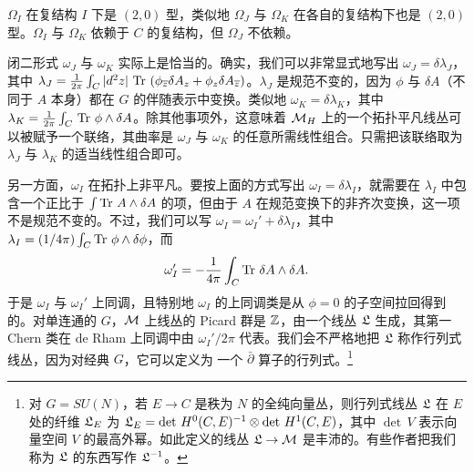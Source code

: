 $\Omega_I$ 在复结构 $I$ 下是 $(2,0)$ 型，类似地 $\Omega_J$ 与 $\Omega_K$ 在各自的复结构下也是 $(2,0)$ 型。$\Omega_I$ 与 $\Omega_K$ 依赖于 $C$ 的复结构，但 $\Omega_J$ 不依赖。

闭二形式 $\omega_J$ 与 $\omega_K$ 实际上是恰当的。确实，我们可以非常显式地写出 $\omega_J=\delta\lambda_J$，其中 $\lambda_J={1\over 2\pi}\int_C |d^2z|\,\Tr\,\left(\phi_{\bar z}\delta A_z+\phi_z\delta A_{\bar z}\right)$。$\lambda_J$ 是规范不变的，因为 $\phi$ 与 $\delta A$（不同于 $A$ 本身）都在 $G$ 的伴随表示中变换。类似地 $\omega_K=\delta\lambda_K$，其中 $\lambda_K={1\over 2\pi}\int_C\,\Tr\,\phi\wedge \delta A$。除其他事项外，这意味着 $\MH$ 上的一个拓扑平凡线丛可以被赋予一个联络，其曲率是 $\omega_J$ 与 $\omega_K$ 的任意所需线性组合。只需把该联络取为 $\lambda_J$ 与 $\lambda_K$ 的适当线性组合即可。

另一方面，$\omega_I$ 在拓扑上非平凡。要按上面的方式写出 $\omega_I=\delta\lambda_I$，就需要在 $\lambda_I$ 中包含一个正比于 $\int \Tr \,A\wedge \delta A$ 的项，但由于 $A$ 在规范变换下的非齐次变换，这一项不是规范不变的。不过，我们可以写 $\omega_I=\omega_I'+\delta\lambda_I$，其中 $\lambda_I=(1/4\pi)\int_C\Tr\,\phi\wedge\delta\phi$，而
\setcounter{equation}{9}
\begin{equation}\label{eq:frox}
\omega_I'=-{1\over 4\pi}\int_C\Tr\,\delta A\wedge\delta
A.
\end{equation}
于是 $\omega_I$ 与 $\omega_I'$ 上同调，且特别地 $\omega_I$ 的上同调类是从 $\phi=0$ 的子空间拉回得到的。对单连通的 $G$，$\M$ 上线丛的 Picard 群是 $\Bbb{Z}$，由一个线丛 ${{\frak L}}$ 生成，其第一 Chern 类在 de Rham 上同调中由 $\omega_I'/2\pi$ 代表。我们会不严格地把 ${{\frak L}}$ 称作行列式线丛，因为对经典 $G$，它可以定义为 \cite{ref60} 一个 $\bar\partial$ 算子的行列式。\footnote{对 $G=SU(N)$，若 $E\to C$ 是秩为 $N$ 的全纯向量丛，则行列式线丛 $\frak L$ 在 $E$ 处的纤维 ${\frak L}_E$ 为 ${\frak L}_E=\det\,H^0(C,E)^{-1}\otimes \det\, H^1(C,E)$，其中 $\det\,V$ 表示向量空间 $V$ 的最高外幂。如此定义的线丛 $\frak L\to \M$ 是丰沛的。有些作者把我们称为 $\frak L$ 的东西写作 ${\frak L}^{-1}$。}

\par{}

